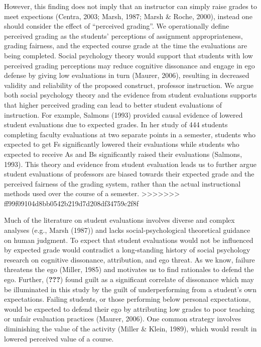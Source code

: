 \documentclass[man]{apa6}
\theoremstyle{definition}
\theoremstyle{definition}
\theoremstyle{definition}
\theoremstyle{remark}
\begin{document}
However, this finding does not imply that an instructor can simply raise
grades to meet expections (Centra, 2003; Marsh, 1987; Marsh \& Roche,
2000), instead one should consider the effect of \enquote{perceived
grading}. We operationally define perceived grading as the students'
perceptions of assignment appropriateness, grading fairness, and the
expected course grade at the time the evaluations are being completed.
Social psychology theory would support that students with low perceived
grading perceptions may reduce cognitive dissonance and engage in ego
defense by giving low evaluations in turn (Maurer, 2006), resulting in
decreased validity and reliability of the proposed construct, professor
instruction. We argue both social psychology theory and the evidence
from student evaluations supports that higher perceived grading can lead
to better student evaluations of instruction. For example, Salmons
(1993) provided causal evidence of lowered student evaluations due to
expected grades. In her study of 444 students completing faculty
evaluations at two separate points in a semester, students who expected
to get Fs significantly lowered their evaluations while students who
expected to receive As and Bs significantly raised their evaluations
(Salmons, 1993). This theory and evidence from student evaluation leads
us to further argue student evaluations of professors are biased towards
their expected grade and the perceived fairness of the grading system,
rather than the actual instructional methods used over the course of a
semester.
\textgreater{}\textgreater{}\textgreater{}\textgreater{}\textgreater{}\textgreater{}\textgreater{}
ff99f09104d8bb0542b219d7d208df34759c2f8f

Much of the literature on student evaluations involves diverse and
complex analyses (e.g., Marsh (1987)) and lacks social-psychological
theoretical guidance on human judgment. To expect that student
evaluations would not be influenced by expected grade would contradict a
long-standing history of social psychology research on cognitive
dissonance, attribution, and ego threat. As we know, failure threatens
the ego (Miller, 1985) and motivates us to find rationales to defend the
ego. Further, ({\textbf{???}}) found guilt as a significant correlate of
dissonance which may be illuminated in this study by the guilt of
underperforming from a student's own expectations. Failing students, or
those performing below personal expectations, would be expected to
defend their ego by attributing low grades to poor teaching or unfair
evaluation practices (Maurer, 2006). One common strategy involves
diminishing the value of the activity (Miller \& Klein, 1989), which
would result in lowered perceived value of a course.
\end{document}
